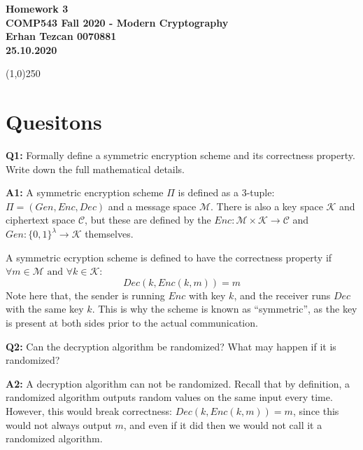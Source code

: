 \documentclass[12pt,reqno]{amsart}
\newcommand{\mand}[0]{\text{ and }}
\newcommand{\msgspc}[0]{\mathcal{M}}
\newcommand{\cphspc}[0]{\mathcal{C}}
\newcommand{\keyspc}[0]{\mathcal{K}}
\begin{document}
\begin{center}
\large\textbf{Homework 3 \\ COMP543 Fall 2020 - Modern Cryptography \\}
\normalsize\textbf{ Erhan Tezcan 0070881 \\ 25.10.2020} \\
\end{center}

\begin{center}
\line(1,0){250}
\end{center}

%
%

\section{Quesitons}
\textbf{Q1:} Formally define a symmetric encryption scheme and its correctness property. Write down the full mathematical details.

\textbf{A1:} A symmetric encryption scheme $\Pi$ is defined as a 3-tuple: $\Pi = (Gen, Enc, Dec)$ and a message space $\msgspc$. There is also a key space $\keyspc$ and ciphertext space $\cphspc$, but these are defined by the $Enc : \msgspc \times \keyspc \xrightarrow{} \cphspc $ and $Gen : \{0, 1\}^\lambda \xrightarrow{} \keyspc$ themselves. 

A symmetric ecryption scheme is defined to have the correctness property if $\forall m \in \msgspc \mand \forall k \in \keyspc$:
$$
Dec(k, Enc(k, m)) = m
$$
Note here that, the sender is running $Enc$ with key $k$, and the receiver runs $Dec$ with the same key $k$. This is why the scheme is known as ``symmetric'', as the key is present at both sides prior to the actual communication.

\vspace{20px}
\textbf{Q2:} Can the decryption algorithm be randomized? What may happen if it is randomized?

\textbf{A2:} A decryption algorithm can not be randomized. Recall that by definition, a randomized algorithm outputs random values on the same input every time. However, this would break correctness: $Dec(k, Enc(k, m)) = m$, since this would not always output $m$, and even if it did then we would not call it a randomized algorithm.
\end{document}
